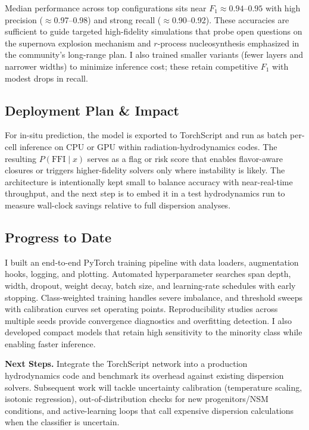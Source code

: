 \documentclass[10pt]{article}
\begin{document}
\begin{center}
Median performance across top configurations sits near $F_1 \approx 0.94$--$0.95$ with high precision ($\approx$0.97--0.98) and strong recall ($\approx$0.90--0.92).
These accuracies are sufficient to guide targeted high-fidelity simulations that probe open questions on the supernova explosion mechanism and $r$-process nucleosynthesis emphasized in the community's long-range plan.
I also trained smaller variants (fewer layers and narrower widths) to minimize inference cost; these retain competitive $F_1$ with modest drops in recall.

\subsection*{Deployment Plan \& Impact}
For in-situ prediction, the model is exported to TorchScript and run as batch per-cell inference on CPU or GPU within radiation-hydrodynamics codes.
The resulting $P(\mathrm{FFI}\mid x)$ serves as a flag or risk score that enables flavor-aware closures or triggers higher-fidelity solvers only where instability is likely.
The architecture is intentionally kept small to balance accuracy with near-real-time throughput, and the next step is to embed it in a test hydrodynamics run to measure wall-clock savings relative to full dispersion analyses.

\subsection*{Progress to Date}
I built an end-to-end PyTorch training pipeline with data loaders, augmentation hooks, logging, and plotting.
Automated hyperparameter searches span depth, width, dropout, weight decay, batch size, and learning-rate schedules with early stopping.
Class-weighted training handles severe imbalance, and threshold sweeps with calibration curves set operating points.
Reproducibility studies across multiple seeds provide convergence diagnostics and overfitting detection.
I also developed compact models that retain high sensitivity to the minority class while enabling faster inference.

\textbf{Next Steps.}
Integrate the TorchScript network into a production hydrodynamics code and benchmark its overhead against existing dispersion solvers. Subsequent work will tackle uncertainty calibration (temperature scaling, isotonic regression), out-of-distribution checks for new progenitors/NSM conditions, and active-learning loops that call expensive dispersion calculations when the classifier is uncertain.
\end{center}
\end{document}
